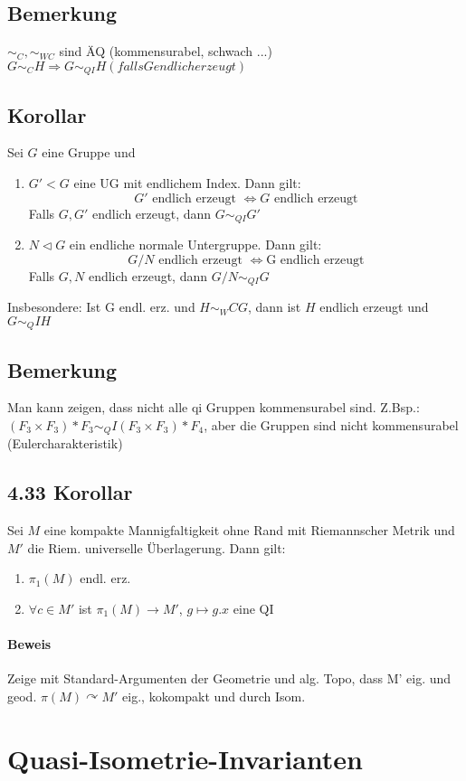 \documentclass{article}
\begin{document}
\subsection{Bemerkung}
$\sim_C, \sim_{WC}$ sind ÄQ (kommensurabel, schwach ...)
$G\sim_C H \Longrightarrow G\sim_{QI}H (falls G endlich erzeugt)$

\subsection{Korollar}
Sei $G$ eine Gruppe und 
\begin{enumerate}
	\item $G' < G$ eine UG mit endlichem Index. Dann gilt:
	\[G' \text{ endlich erzeugt } \Longleftrightarrow G \text{ endlich erzeugt} \]
	Falls $G,G'$ endlich erzeugt, dann $G \sim_{QI} G'$
	\item $N \vartriangleleft G$ ein endliche normale Untergruppe. Dann gilt:
	\[G/ N \text{ endlich erzeugt } \Longleftrightarrow \text{G endlich erzeugt} \]
	Falls $G,N$ endlich erzeugt, dann $G/N \sim_{QI} G$
\end{enumerate}
Insbesondere: Ist G endl. erz. und $H \sim_WC G$, dann ist $H$ endlich erzeugt und $G\sim_QI H$
\subsection{Bemerkung}
Man kann zeigen, dass nicht alle qi Gruppen kommensurabel sind. Z.Bsp.: $(F_3\times F_3)* F_3 \sim_QI (F_3\times F_3)*F_4$, aber die Gruppen sind nicht kommensurabel (Eulercharakteristik)

\subsection{4.33 Korollar}
Sei $M$ eine kompakte Mannigfaltigkeit ohne Rand mit Riemannscher Metrik und $M'$ die Riem. universelle Überlagerung. Dann gilt:
\begin{enumerate}
	\item $\pi_1(M)$ endl. erz.
	\item $\forall c \in M'$ ist $\pi_1(M) \rightarrow M'$, $g\longmapsto g.x$ eine QI
\end{enumerate}
\paragraph{Beweis}
Zeige mit Standard-Argumenten der Geometrie und alg. Topo, dass M' eig. und geod.
$\pi(M) \curvearrowright M'$ eig., kokompakt und durch Isom.
\section{Quasi-Isometrie-Invarianten}
\end{document}
